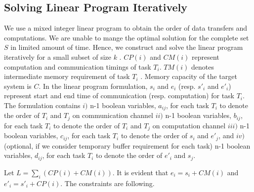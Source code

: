 \documentclass[runningheads]{llncs} %
\begin{document}
\subsection{Solving Linear Program Iteratively}
We use a mixed integer linear program  to obtain the order of data transfers and computations. We are unable to mange the optimal solution for the complete set $S$ in limited amount of time.  Hence, we construct and solve the linear program iteratively for a small subset of size $k$ . $CP(i)$ and $CM(i)$ represent computation and communication timings of task $T_i$. $TM(i)$ denotes intermediate memory requirement of task $T_i$ . Memory capacity of the  target system is $C$. In the linear program formulation, $s_i$ and $e_i$ (resp. $s'_i$ and $e'_i$) represent start and end time of communication (resp. computation) for task $T_i$. The formulation contains $i)$ n-1 boolean variables, $a_{ij}$, for each task $T_i$ to denote the order of $T_i$ and $T_j$  on communication channel   $ii)$ n-1 boolean variables, $b_{ij}$, for each task $T_i$ to denote the order of $T_i$ and $T_j$  on computation channel $iii)$ n-1 boolean variables, $c_{ij}$, for each task $T_i$ to denote the order of $s_i$ and $e'_j$, and $iv)$ (optional, if we consider temporary buffer requirement for each task) n-1 boolean variables, $d_{ij}$, for each task $T_i$ to denote the order of $e'_i$ and $s_j$.



\noindent Let $L=\sum_i (CP(i) + CM(i))$. It is evident that $e_i =s_i + CM(i)$ and $e'_i =s'_i + CP(i)$. The constraints are following.
\end{document}
